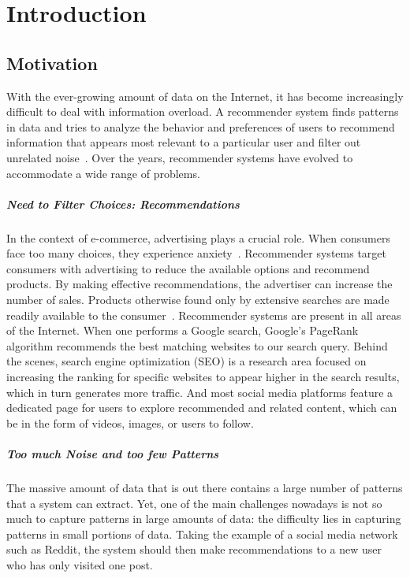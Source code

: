 \chapter{Introduction}\label{ch:introduction}

\section{Motivation}
With the ever-growing amount of data on the Internet, it has become increasingly difficult to deal with information overload. A recommender system finds patterns in data and tries to analyze the behavior and preferences of users to recommend information that appears most relevant to a particular user and filter out unrelated noise~\cite{isinkaye2015recommendation}. Over the years, recommender systems have evolved to accommodate a wide range of problems.

\paragraph{Need to Filter Choices: Recommendations}
In the context of e-commerce, advertising plays a crucial role. When consumers face too many choices, they experience anxiety~\cite{schwartz2004doing}. Recommender systems target consumers with advertising to reduce the available options and recommend products. By making effective recommendations, the advertiser can increase the number of sales.
Products otherwise found only by extensive searches are made readily available to the consumer~\cite{rohde2018recogym}. Recommender systems are present in all areas of the Internet. When one performs a Google search, Google's PageRank algorithm recommends the best matching websites to our search query. Behind the scenes, search engine optimization (SEO) is a research area focused on increasing the ranking for specific websites to appear higher in the search results, which in turn generates more traffic. And most social media platforms feature a dedicated page for users to explore recommended and related content, which can be in the form of videos, images, or users to follow.

\paragraph{Too much Noise and too few Patterns}
The massive amount of data that is out there contains a large number of patterns that a system can extract. Yet, one of the main challenges nowadays is not so much to capture patterns in large amounts of data: the difficulty lies in capturing patterns in small portions of data. Taking the example of a social media network such as Reddit, the system should then make recommendations to a new user who has only visited one post.

